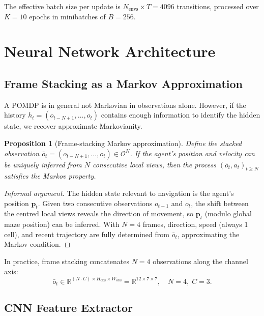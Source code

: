 \documentclass[11pt,a4paper]{article}
\newtheorem{proposition}[theorem]{Proposition}
\newcommand{\R}{\mathbb{R}}
\newcommand{\cO}{\mathcal{O}}
\begin{document}
The effective batch size per update is $N_{\text{envs}} \times T = 4096$ transitions,
processed over $K=10$ epochs in minibatches of $B=256$.

\section{Neural Network Architecture}

\subsection{Frame Stacking as a Markov Approximation}

A POMDP is in general not Markovian in observations alone.
However, if the history $h_t = (o_{t-N+1}, \ldots, o_t)$ contains enough
information to identify the hidden state, we recover approximate Markovianity.

\begin{proposition}[Frame-stacking Markov approximation]
\label{prop:framestack}
Define the stacked observation
$\bar{o}_t = (o_{t-N+1}, \ldots, o_t) \in \cO^N$.
If the agent's position and velocity can be uniquely inferred from
$N$ consecutive local views, then the process
$(\bar{o}_t, a_t)_{t \ge N}$ satisfies the Markov property.
\end{proposition}

\begin{proof}[Informal argument]
The hidden state relevant to navigation is the agent's position $\mathbf{p}_t$.
Given two consecutive observations $o_{t-1}$ and $o_t$, the shift
between the centred local views reveals the direction of movement,
so $\mathbf{p}_t$ (modulo global maze position) can be inferred.
With $N=4$ frames, direction, speed (always 1 cell), and recent trajectory
are fully determined from $\bar{o}_t$, approximating the Markov condition.
\end{proof}

In practice, frame stacking concatenates $N=4$ observations along the channel axis:
\begin{equation}
  \bar{o}_t \in \R^{(N \cdot C) \times H_{\text{obs}} \times W_{\text{obs}}}
  = \R^{12 \times 7 \times 7},
  \quad N=4,\; C=3.
\end{equation}

\subsection{CNN Feature Extractor}
\end{document}
